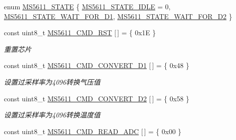 \begin{DoxyCompactItemize}
\item 
enum \hyperlink{group__ms5611__driver__internal_ga87a0c5ca64ec1e29ddc31ab17c5f5022}{M\+S5611\+\_\+\+S\+T\+A\+TE} \{ \hyperlink{group__ms5611__driver__internal_gga87a0c5ca64ec1e29ddc31ab17c5f5022a6d4551647d3829b1242a8969b23fb734}{M\+S5611\+\_\+\+S\+T\+A\+T\+E\+\_\+\+I\+D\+LE} = 0, 
\hyperlink{group__ms5611__driver__internal_gga87a0c5ca64ec1e29ddc31ab17c5f5022a4db01813fd057df7b345979e2edc8065}{M\+S5611\+\_\+\+S\+T\+A\+T\+E\+\_\+\+W\+A\+I\+T\+\_\+\+F\+O\+R\+\_\+\+D1}, 
\hyperlink{group__ms5611__driver__internal_gga87a0c5ca64ec1e29ddc31ab17c5f5022a570e87eedddd77822a83145040fc920c}{M\+S5611\+\_\+\+S\+T\+A\+T\+E\+\_\+\+W\+A\+I\+T\+\_\+\+F\+O\+R\+\_\+\+D2}
 \}
\item 
const uint8\+\_\+t \hyperlink{group__ms5611__driver__internal_gafa5b8ac64374d19d8f1e5d8e2b94b73c}{M\+S5611\+\_\+\+C\+M\+D\+\_\+\+R\+ST} \mbox{[}$\,$\mbox{]} = \{ 0x1\+E \}\hypertarget{group__ms5611__driver__internal_gafa5b8ac64374d19d8f1e5d8e2b94b73c}{}\label{group__ms5611__driver__internal_gafa5b8ac64374d19d8f1e5d8e2b94b73c}

\begin{DoxyCompactList}\small\item\em 重置芯片 \end{DoxyCompactList}\item 
const uint8\+\_\+t \hyperlink{group__ms5611__driver__internal_gab1acc41277710ab70dc70946ca8e1819}{M\+S5611\+\_\+\+C\+M\+D\+\_\+\+C\+O\+N\+V\+E\+R\+T\+\_\+\+D1} \mbox{[}$\,$\mbox{]} = \{ 0x48 \}\hypertarget{group__ms5611__driver__internal_gab1acc41277710ab70dc70946ca8e1819}{}\label{group__ms5611__driver__internal_gab1acc41277710ab70dc70946ca8e1819}

\begin{DoxyCompactList}\small\item\em 设置过采样率为4096转换气压值 \end{DoxyCompactList}\item 
const uint8\+\_\+t \hyperlink{group__ms5611__driver__internal_gae1a9a783b78f3d8b8ab20357243b1d2f}{M\+S5611\+\_\+\+C\+M\+D\+\_\+\+C\+O\+N\+V\+E\+R\+T\+\_\+\+D2} \mbox{[}$\,$\mbox{]} = \{ 0x58 \}\hypertarget{group__ms5611__driver__internal_gae1a9a783b78f3d8b8ab20357243b1d2f}{}\label{group__ms5611__driver__internal_gae1a9a783b78f3d8b8ab20357243b1d2f}

\begin{DoxyCompactList}\small\item\em 设置过采样率为4096转换温度值 \end{DoxyCompactList}\item 
const uint8\+\_\+t \hyperlink{group__ms5611__driver__internal_ga12183abd8008830f5d763fc8400d414c}{M\+S5611\+\_\+\+C\+M\+D\+\_\+\+R\+E\+A\+D\+\_\+\+A\+DC} \mbox{[}$\,$\mbox{]} = \{ 0x00 \}\hypertarget{group__ms5611__driver__internal_ga12183abd8008830f5d763fc8400d414c}{}\label{group__ms5611__driver__internal_ga12183abd8008830f5d763fc8400d414c}


\end{DoxyCompactItemize}
